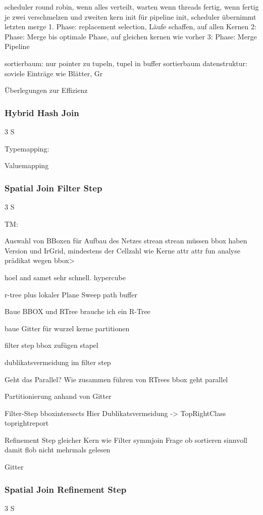 \documentclass[a4paper,12pt,twoside]{article}
\begin{document}
scheduler round robin, wenn alles verteilt, warten wenn threads fertig, wenn fertig je zwei verschmelzen und zweiten kern init für pipeline init, scheduler übernimmt letzten merge
1. Phase: replacement selection, Läufe schaffen, auf allen Kernen
2: Phase: Merge bis optimale Phase, auf gleichen kernen wie vorher
3: Phase: Merge Pipeline

sortierbaum: nur pointer zu tupeln, tupel in buffer
sortierbaum datenstruktur: soviele Einträge wie Blätter, Gr

Überlegungen zur Effizienz

\subsubsection{Hybrid Hash Join} 3 S

Typemapping:

Valuemapping

\subsubsection{Spatial Join Filter Step} 3 S




TM:

Auswahl von BBoxen für Aufbau des Netzes
strean strean müssen bbox haben Version und IrGrid, mindestens der Cellzahl wie Kerne
attr attr fun
analyse prädikat wegen bbox>

hoel and samet sehr schnell. hypercube

r-tree plus lokaler Plane Sweep
path buffer


Baue BBOX und RTree
brauche ich ein R-Tree

baue Gitter für wurzel kerne partitionen

filter step bbox zufügen stapel

dublikatsvermeidung im filter step

Geht das Parallel? Wie zusammen führen von RTrees
bbox geht parallel

Partitionierung
anhand von Gitter

Filter-Step
bboxintersects
Hier Dublikatsvermeidung -> TopRightClass
toprightreport

Refinement Step gleicher Kern wie Filter
symmjoin
Frage ob sortieren sinnvoll damit flob nicht mehrmals gelesen

Gitter

\subsubsection{Spatial Join Refinement Step} 3 S
\end{document}
